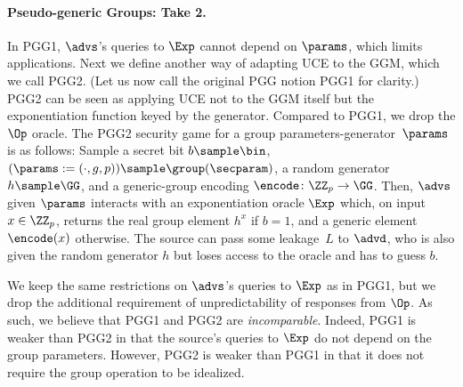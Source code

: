 {\begin{itemize}

\iffalse
\paragraph*{Pseudo-generic Groups: Take 2.}
In PGG1, $\advs$'s queries to $\Exp$ cannot depend on $\params$, which limits  applications.   Next we define another way of adapting UCE to the GGM, which we call PGG2. (Let us now call the original PGG notion PGG1 for clarity.)  PGG2 can be seen as applying UCE not to the GGM itself but the exponentiation function keyed by the generator. Compared to PGG1, we drop the $\Op$ oracle.  The PGG2 security game for a group parameters-generator~$\params$  is as follows: Sample a secret bit $b \sample \bin$, $(\params := (\cdot, g, p)) \sample \group(\secparam)$, a random generator $h \sample \GG$, and a generic-group encoding $\encode \colon \ZZ_p \to \GG$. Then, $\advs$ given $\params$ interacts with an exponentiation oracle $\Exp$ which, on input $x \in \ZZ_p$, returns the real group element $h^x$ if $b = 1$, and a generic element $\encode(x)$ otherwise. The source can pass some leakage~$L$ to $\advd$, who is also given the random generator $h$ but loses access to the oracle and has to guess $b$.

We keep the same restrictions on $\advs$'s queries to $\Exp$ as in PGG1, but we drop the additional requirement of unpredictability of responses from $\Op$.  As such, we believe that PGG1 and PGG2 are \emph{incomparable}.  Indeed, PGG1 is weaker than PGG2 in that the source's queries to $\Exp$ do not depend on the group parameters. However, PGG2 is weaker than PGG1 in that it does not require the group operation to be idealized.


\end{itemize}}
